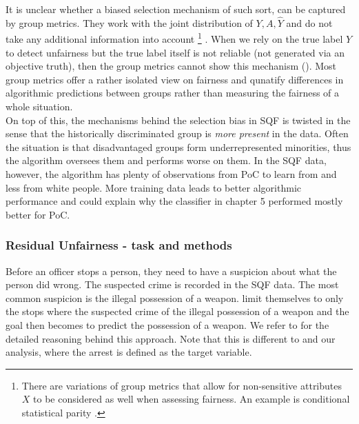 It is unclear whether a biased selection mechanism of such sort, can be captured by group metrics. They work with the joint distribution of $Y, A, \hat{Y}$ and do not take any additional information into account \footnote{There are variations of group metrics that allow for non-sensitive attributes $X$ to be considered as well when assessing fairness. An example is conditional statistical parity \cite{verma2018}.} . When we rely on the true label $Y$ to detect unfairness but the true label itself is not reliable (not generated via an objective truth), then the group metrics cannot show this mechanism (\cite{castelnovo2022}). Most group metrics offer a rather isolated view on fairness and qunatify differences in algorithmic predictions between groups rather than measuring the fairness of a whole situation.\\
On top of this, the mechanisms behind the selection bias in SQF is twisted in the sense that the historically discriminated group is \textit{more present} in the data. Often the situation is that disadvantaged groups form underrepresented minorities, thus the algorithm oversees them and performs worse on them. In the SQF data, however, the algorithm has plenty of observations from PoC to learn from and less from white people. More training data leads to better algorithmic performance and could explain why the classifier in chapter 5 performed mostly better for PoC.

\subsubsection*{Residual Unfairness - task and methods}
Before an officer stops a person, they need to have a suspicion about what the person did wrong. The suspected crime is recorded in the SQF data. The most common suspicion is the illegal possession of a weapon. \cite{kallus2018} limit themselves to only the stops where the suspected crime of the illegal possession of a weapon and the goal then becomes to predict the possession of a weapon. We refer to \cite{goel2016} for the detailed reasoning behind this approach.
Note that this is different to \cite{Badr2022DTFANSP} and our analysis, where the arrest is defined as the target variable.\\

